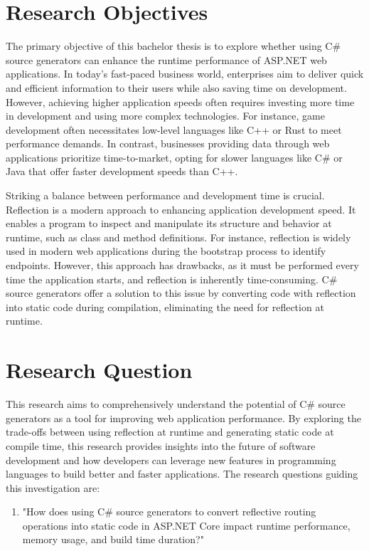 \section{Research Objectives}

The primary objective of this bachelor thesis is to explore whether using C\# source generators can enhance the runtime performance of ASP.NET web applications. In today's fast-paced business world, enterprises aim to deliver quick and efficient information to their users while also saving time on development. However, achieving higher application speeds often requires investing more time in development and using more complex technologies. For instance, game development often necessitates low-level languages like C++ or Rust to meet performance demands. In contrast, businesses providing data through web applications prioritize time-to-market, opting for slower languages like C\# or Java that offer faster development speeds than C++.

Striking a balance between performance and development time is crucial. Reflection is a modern approach to enhancing application development speed. It enables a program to inspect and manipulate its structure and behavior at runtime, such as class and method definitions. For instance, reflection is widely used in modern web applications during the bootstrap process to identify endpoints. However, this approach has drawbacks, as it must be performed every time the application starts, and reflection is inherently time-consuming. C\# source generators offer a solution to this issue by converting code with reflection into static code during compilation, eliminating the need for reflection at runtime.

\section{Research Question}

This research aims to comprehensively understand the potential of C\# source generators as a tool for improving web application performance. By exploring the trade-offs between using reflection at runtime and generating static code at compile time, this research provides insights into the future of software development and how developers can leverage new features in programming languages to build better and faster applications. The research questions guiding this investigation are:

\begin{enumerate}[label=\textbf{RQ.\arabic*}:, leftmargin=*, labelindent=1em]
    \item "How does using C\# source generators to convert reflective routing operations into static code in ASP.NET Core impact runtime performance, memory usage, and build time duration?"
\end{enumerate}

